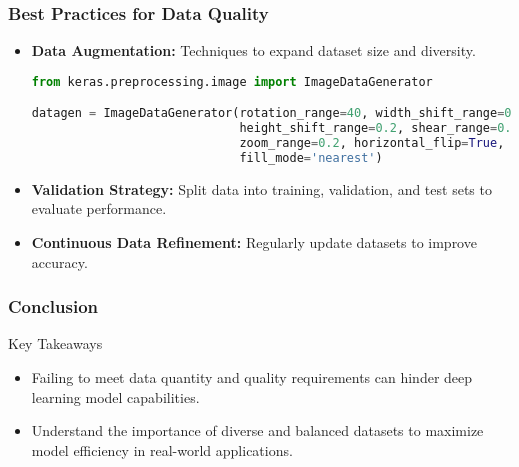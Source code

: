 \documentclass[aspectratio=169]{beamer}
\begin{document}
\begin{frame}[fragile]
    \frametitle{Best Practices for Data Quality}
    \begin{itemize}
        \item \textbf{Data Augmentation:} Techniques to expand dataset size and diversity.
        \begin{lstlisting}[language=Python]
from keras.preprocessing.image import ImageDataGenerator

datagen = ImageDataGenerator(rotation_range=40, width_shift_range=0.2,
                             height_shift_range=0.2, shear_range=0.2,
                             zoom_range=0.2, horizontal_flip=True,
                             fill_mode='nearest')
        \end{lstlisting}
        
        \item \textbf{Validation Strategy:} Split data into training, validation, and test sets to evaluate performance.
        \item \textbf{Continuous Data Refinement:} Regularly update datasets to improve accuracy.
    \end{itemize}
\end{frame}

\begin{frame}[fragile]
    \frametitle{Conclusion}
    \begin{block}{Key Takeaways}
        \begin{itemize}
            \item Failing to meet data quantity and quality requirements can hinder deep learning model capabilities.
            \item Understand the importance of diverse and balanced datasets to maximize model efficiency in real-world applications.
        \end{itemize}
    \end{block}
\end{frame}
\end{document}
